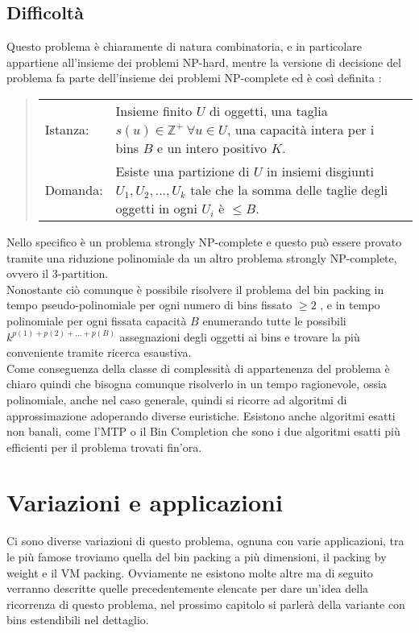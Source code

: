 \subsection{Difficoltà}
Questo problema è chiaramente di natura combinatoria, e in particolare appartiene all'insieme dei problemi NP-hard, mentre
la versione di decisione del problema fa parte dell'insieme dei problemi NP-complete ed è così definita \cite{CaI_NP}:
\begin{quote}
    \begin{tabularx}{\textwidth}{lp{8.5cm}X}
    	Istanza: & Insieme finito $ U $ di oggetti, una taglia $ s(u) \in \mathbb{Z}^+ \: \forall u \in U $, una capacità intera
				   per i bins $ B $ e un intero positivo $ K $. \\
		Domanda: & Esiste una partizione di $ U $ in insiemi disgiunti $ U_1, U_2, ..., U_k $ tale che la somma delle taglie degli
				   oggetti in ogni $ U_i $ è $ \leq B $. \\
    \end{tabularx}
\end{quote}
Nello specifico è un problema strongly NP-complete e questo può essere provato tramite una riduzione polinomiale da un altro
problema strongly NP-complete, ovvero il 3-partition. \\
Nonostante ciò comunque è possibile risolvere il problema del bin packing in tempo pseudo-polinomiale per ogni numero di
bins fissato $ \geq 2 $ \cite{BinPackingFixedSize}, e in tempo polinomiale per
ogni fissata capacità $ B $ enumerando tutte le possibili $ k^{p(1) + p(2) + ... + p(B)} $ assegnazioni degli oggetti ai
bins e trovare la più conveniente tramite ricerca esaustiva. \\
Come conseguenza della classe di complessità di appartenenza del problema è chiaro quindi che bisogna comunque risolverlo
in un tempo ragionevole, ossia polinomiale, anche nel caso generale, quindi si ricorre ad algoritmi
di approssimazione adoperando diverse euristiche.
Esistono anche algoritmi esatti non banali, come l'MTP \cite{MTP} o il Bin Completion \cite{BinCompletion} che sono i due
algoritmi esatti più efficienti per il problema trovati fin'ora.


\section{Variazioni e applicazioni}
Ci sono diverse variazioni di questo problema, ognuna con varie applicazioni, tra le più famose troviamo quella
del bin packing a più dimensioni, il packing by weight e il VM packing. Ovviamente ne esistono molte altre ma di seguito 
verranno descritte quelle precedentemente elencate per dare un'idea della ricorrenza di questo problema, nel prossimo 
capitolo si parlerà della variante con bins estendibili nel dettaglio.

